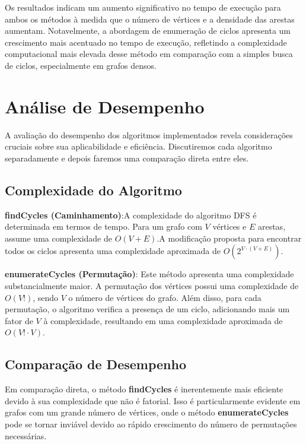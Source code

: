 \documentclass{article}
\begin{document}
Os resultados indicam um aumento significativo no tempo de execução para ambos os métodos à medida que o número de vértices e a densidade das arestas aumentam. Notavelmente, a abordagem de enumeração de ciclos apresenta um crescimento mais acentuado no tempo de execução, refletindo a complexidade computacional mais elevada desse método em comparação com a simples busca de ciclos, especialmente em grafos densos.


\section{Análise de Desempenho}

A avaliação do desempenho dos algoritmos implementados revela considerações cruciais sobre sua aplicabilidade e eficiência. Discutiremos cada algoritmo separadamente e depois faremos uma comparação direta entre eles.

\subsection{Complexidade do Algoritmo}

\textbf{findCycles (Caminhamento)}:A complexidade do algoritmo DFS é determinada em termos de tempo. Para um grafo com \( V \) vértices e \( E \) arestas, assume uma complexidade de \( O(V + E) \).A modificação proposta para encontrar todos os ciclos apresenta uma complexidade aproximada de \( O(2^{V \cdot (V+E)}) \).

\textbf{enumerateCycles (Permutação)}: Este método apresenta uma complexidade substancialmente maior. A permutação dos vértices possui uma complexidade de \( O(V!) \), sendo \( V \) o número de vértices do grafo. Além disso, para cada permutação, o algoritmo verifica a presença de um ciclo, adicionando mais um fator de \( V \) à complexidade, resultando em uma complexidade aproximada de \( O(V! \cdot V) \).

\subsection{Comparação de Desempenho}

Em comparação direta, o método \textbf{findCycles} é inerentemente mais eficiente devido à sua complexidade que não é fatorial. Isso é particularmente evidente em grafos com um grande número de vértices, onde o método \textbf{enumerateCycles} pode se tornar inviável devido ao rápido crescimento do número de permutações necessárias.
\end{document}

